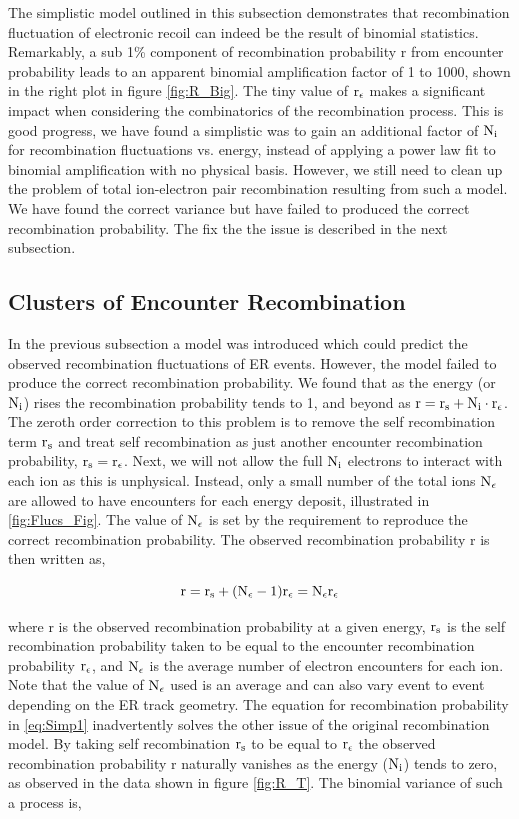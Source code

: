 The simplistic model outlined in this subsection demonstrates that recombination fluctuation of electronic recoil can indeed be the result of binomial statistics. Remarkably, a sub 1\% component of recombination probability r from encounter probability leads to an apparent binomial amplification factor of 1 to 1000, shown in the right plot in figure \ref{fig:R_Big}. The tiny value of $\rm r_\epsilon$ makes a significant impact when considering the combinatorics of the recombination process. This is good progress, we have found a simplistic was to gain an additional factor of $\rm N_i$ for recombination fluctuations vs. energy, instead of applying a power law fit to binomial amplification with no physical basis. However, we still need to clean up the problem of total ion-electron pair recombination resulting from such a model. We have found the correct variance but have failed to produced the correct recombination probability. The fix the the issue is described in the next subsection.


\subsection{Clusters of Encounter Recombination}

In the previous subsection a model was introduced which could predict the observed recombination fluctuations of ER events. However, the model failed to produce the correct recombination probability. We found that as the energy (or $\rm N_i$) rises the recombination probability tends to 1, and beyond as $\rm r=r_s + N_i\cdot r_\epsilon$. The zeroth order correction to this problem is to remove the self recombination term $\rm r_s$ and treat self recombination as just another encounter recombination probability, $\rm r_s=r_\epsilon$. Next, we will not allow the full $\rm N_i$ electrons to interact with each ion as this is unphysical. Instead, only a small number of the total ions $\rm N_\epsilon$ are allowed to have encounters for each energy deposit, illustrated in \ref{fig:Flucs_Fig}. The value of $\rm N_\epsilon$ is set by the requirement to reproduce the correct recombination probability. The observed recombination probability r is then written as,

\begin{equation}
\rm r=r_s+(N_\epsilon-1) r_\epsilon = N_\epsilon r_\epsilon
\label{eq:Simp1}
\end{equation}

\noindent where r is the observed recombination probability at a given energy, $\rm r_s$ is the self recombination probability taken to be equal to the encounter recombination probability $\rm r_\epsilon$, and $\rm N_\epsilon$ is the average number of electron encounters for each ion. Note that the value of $\rm N_\epsilon$ used is an average and can also vary event to event depending on the ER track geometry. The equation for recombination probability in \ref{eq:Simp1} inadvertently solves the other issue of the original recombination model. By taking self recombination $\rm r_s$ to be equal to $\rm r_\epsilon$ the observed recombination probability r naturally vanishes as the energy ($\rm N_i$) tends to zero, as observed in the data shown in figure \ref{fig:R_T}. The binomial variance of such a process is,


